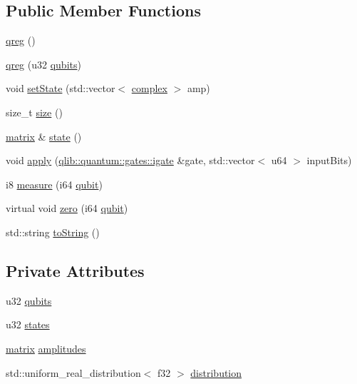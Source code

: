 \subsection*{Public Member Functions}
\begin{DoxyCompactItemize}
\item 
\hyperlink{classqlib_1_1quantum_1_1qreg_aa53d83236917f0048965b487088aacb9}{qreg} ()
\item 
\hyperlink{classqlib_1_1quantum_1_1qreg_a2ddfaef9a369571c9600c4c259fcb8b1}{qreg} (u32 \hyperlink{classqlib_1_1quantum_1_1qreg_a2d7c33e71a77d860d50d53a258a71a6f}{qubits})
\item 
void \hyperlink{classqlib_1_1quantum_1_1qreg_a727b26ff6fc1590ad3897884cbc397af}{set\+State} (std\+::vector$<$ \hyperlink{classqlib_1_1math_1_1complex}{complex} $>$ amp)
\item 
size\+\_\+t \hyperlink{classqlib_1_1quantum_1_1qreg_a3148742b59865d0ba04fdd327fccc048}{size} ()
\item 
\hyperlink{classqlib_1_1math_1_1matrix}{matrix} \& \hyperlink{classqlib_1_1quantum_1_1qreg_a20d1b0906eb00ff7d4e1c23449de61a1}{state} ()
\item 
void \hyperlink{classqlib_1_1quantum_1_1qreg_af38f95ecaaf7de400856094154343cfe}{apply} (\hyperlink{classqlib_1_1quantum_1_1gates_1_1igate}{qlib\+::quantum\+::gates\+::igate} \&gate, std\+::vector$<$ u64 $>$ input\+Bits)
\item 
i8 \hyperlink{classqlib_1_1quantum_1_1qreg_acfcd58502c1e511766ede52a891f27c3}{measure} (i64 \hyperlink{classqlib_1_1quantum_1_1qubit}{qubit})
\item 
virtual void \hyperlink{classqlib_1_1quantum_1_1qreg_a51eb9abfde64d764ca2afa27666df0e1}{zero} (i64 \hyperlink{classqlib_1_1quantum_1_1qubit}{qubit})
\item 
std\+::string \hyperlink{classqlib_1_1quantum_1_1qreg_ae4dbf316bf6452f3110cb05146f54954}{to\+String} ()
\end{DoxyCompactItemize}
\subsection*{Private Attributes}
\begin{DoxyCompactItemize}
\item 
u32 \hyperlink{classqlib_1_1quantum_1_1qreg_a2d7c33e71a77d860d50d53a258a71a6f}{qubits}
\item 
u32 \hyperlink{classqlib_1_1quantum_1_1qreg_ad0e84b959f93f3da6ed81eb096f809d1}{states}
\item 
\hyperlink{classqlib_1_1math_1_1matrix}{matrix} \hyperlink{classqlib_1_1quantum_1_1qreg_a1a7e244ee72b78b9c5a8763efad57ada}{amplitudes}
\item 
std\+::uniform\+\_\+real\+\_\+distribution$<$ f32 $>$ \hyperlink{classqlib_1_1quantum_1_1qreg_aabd605497170f57cdbb175d21c99662e}{distribution}
\end{DoxyCompactItemize}


